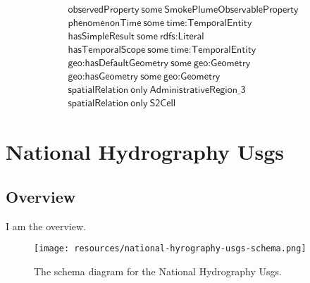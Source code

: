 \begin{align}
  \textsf{observedProperty}~\textsf{some}~\textsf{SmokePlumeObservableProperty}\\
  \textsf{phenomenonTime}~\textsf{some}~\textsf{time:TemporalEntity}\\
  \textsf{hasSimpleResult}~\textsf{some}~\textsf{rdfs:Literal}\\
  \textsf{hasTemporalScope}~\textsf{some}~\textsf{time:TemporalEntity}\\
  \textsf{geo:hasDefaultGeometry}~\textsf{some}~\textsf{geo:Geometry}\\
  \textsf{geo:hasGeometry}~\textsf{some}~\textsf{geo:Geometry}\\
  \textsf{spatialRelation}~\textsf{only}~\textsf{AdministrativeRegion\_3}\\
  \textsf{spatialRelation}~\textsf{only}~\textsf{S2Cell}\end{align}



\section{National Hydrography Usgs}
\label{sec:national-hydrography-usgs}
\subsection{Overview}
\label{ssec:overview}

I am the overview.

\begin{figure}[h!]
  \begin{center}
    \texttt{[image: resources/national-hyrography-usgs-schema.png]}
  \end{center}
  \caption{The schema diagram for the National Hydrography Usgs.}
  \label{fig:ov-diagram}
\end{figure}


